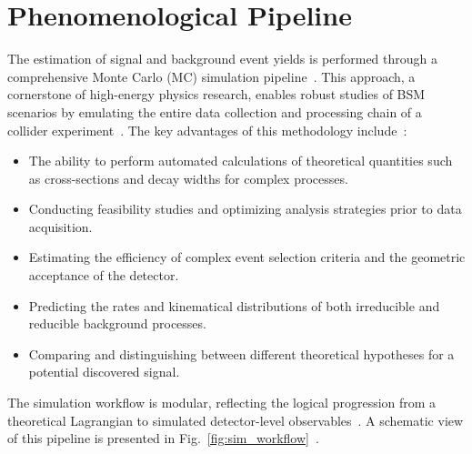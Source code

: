 \section{Phenomenological Pipeline}

The estimation of signal and background event yields is performed through a comprehensive Monte Carlo (MC) simulation pipeline~\cite{Christensen:2008py,Alloul:2013bka,Degrande:2011ua,Alwall:2014hca}. This approach, a cornerstone of high-energy physics research, enables robust studies of BSM scenarios by emulating the entire data collection and processing chain of a collider experiment~\cite{Sjostrand:2014zea,deFavereau:2013fsa}. The key advantages of this methodology include~\cite{Alwall:2014hca,Cacciari:2011ma}:

\begin{itemize}
    \item The ability to perform automated calculations of theoretical quantities such as cross-sections and decay widths for complex processes.
    \item Conducting feasibility studies and optimizing analysis strategies prior to data acquisition.
    \item Estimating the efficiency of complex event selection criteria and the geometric acceptance of the detector.
    \item Predicting the rates and kinematical distributions of both irreducible and reducible background processes.
    \item Comparing and distinguishing between different theoretical hypotheses for a potential discovered signal.
\end{itemize}

The simulation workflow is modular, reflecting the logical progression from a theoretical Lagrangian to simulated detector-level observables~\cite{Christensen:2008py,Alloul:2013bka,Degrande:2011ua,Alwall:2014hca}. A schematic view of this pipeline is presented in Fig.~\ref{fig:sim_workflow}~\cite{Alwall:2014hca,deFavereau:2013fsa}.

